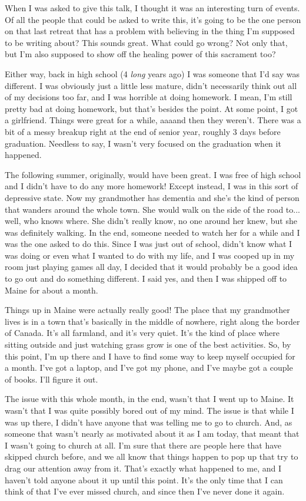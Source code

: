 \documentclass[12pt]{article}
\begin{document}
    When I was asked to give this talk, I thought it was an interesting turn of events. Of all the people that could
    be asked to write this, it's going to be the one person on that last retreat that has a problem with believing
    in the thing I'm supposed to be writing about? This sounds great. What could go wrong? Not only that, but I'm also
    supposed to show off the healing power of this sacrament too?

    Either way, back in high school (4 \textit{long} years ago) I was someone that I'd say was different. I was obviously
    just a little less mature, didn't necessarily think out all of my decisions too far, and I was horrible at doing homework.
    I mean, I'm still pretty bad at doing homework, but that's besides the point. At some point, I got a girlfriend. Things
    were great for a while, aaaand then they weren't. There was a bit of a messy breakup right at the end of senior year,
    roughly 3 days before graduation. Needless to say, I wasn't very focused on the graduation when it happened.

    The following summer, originally, would have been great. I was free of high school and I didn't have to do any more
    homework! Except instead, I was in this sort of depressive state. Now my grandmother has dementia and she's the kind
    of person that wanders around the whole town. She would walk on the side of the road to... well, who knows where.
    She didn't really know, no one around her knew, but she was definitely walking. In the end, someone needed to watch her
    for a while and I was the one asked to do this. Since I was just out of school, didn't know what I was doing or
    even what I wanted to do with my life, and I was cooped up in my room just playing games all day, I decided that it
    would probably be a good idea to go out and do something different. I said yes, and then I was shipped off to Maine
    for about a month.

    Things up in Maine were actually really good! The place that my grandmother lives is in a town that's basically in
    the middle of nowhere, right along the border of Canada. It's all farmland, and it's very quiet. It's the kind of 
    place where sitting outside and just watching grass grow is one of the best activities. So, by this point, I'm up
    there and I have to find some way to keep myself occupied for a month. I've got a laptop, and I've got my phone,
    and I've maybe got a couple of books. I'll figure it out.

    The issue with this whole month, in the end, wasn't that I went up to Maine. It wasn't that I was quite possibly
    bored out of my mind. The issue is that while I was up there, I didn't have anyone that was telling me to go to
    church. And, as someone that wasn't nearly as motivated about it as I am today, that meant that I wasn't going to
    church at all. I'm sure that there are people here that have skipped church before, and we all know that things
    happen to pop up that try to drag our attention away from it. That's exactly what happened to me, and I haven't
    told anyone about it up until this point. It's the only time that I can think of that I've ever missed church,
    and since then I've never done it again.
\end{document}
